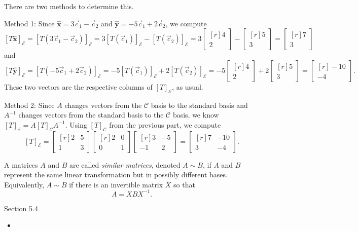 \documentclass{problemset}
\newcommand{\xhat}{{\hat {\mathbf x}}}
\newcommand{\yhat}{{\hat {\mathbf y}}}
\newcommand{\mat}[1]{\begin{bmatrix*}[r]#1\end{bmatrix*}}
\begin{document}
\begin{parts}[resume]
\begin{solution}
				There are two methods to determine this.

				Method 1: 
				Since $\xhat=3\vec c_1-\vec c_2$ and $\yhat=-5\vec c_1+2\vec c_2$,
				we compute
				\[
					[T\xhat]_{\mathcal E}
					=[T(3\vec c_1-\vec c_2)]_{\mathcal E}
					=3[T(\vec c_1)]_{\mathcal E}-[T(\vec c_2)]_{\mathcal E}
					=3\mat{4\\2}-\mat{5\\3}
					=\mat{7\\3}
				\]
				and
				\[
					[T\yhat]_{\mathcal E}
					=[T(-5\vec c_1+2\vec c_2)]_{\mathcal E}
					=-5[T(\vec c_1)]_{\mathcal E}+2[T(\vec c_2)]_{\mathcal E}
					=-5\mat{4\\2}+2\mat{5\\3}
					=\mat{-10\\-4}.
				\]
				These two vectors are the respective columns of $[T]_{\mathcal E}$,
				as usual.

				Method 2:
				Since $A$ changes vectors from the $\mathcal C$ basis to the standard
				basis and $A^{-1}$ changes vectors from the standard basis to the
				$\mathcal C$ basis, we know $[T]_{\mathcal E} = A[T]_{\mathcal C}A^{-1}$. 
				Using $[T]_{\mathcal C}$ from the previous part, we compute
				\[
					[T]_{\mathcal E}
					=\mat{2&5\\1&3}\mat{2&0\\0&1}\mat{3&-5\\-1&2}
					=\mat{7&-10\\3&-4}.
				\]


			\end{solution}
	\end{parts}
	\begin{definition}
		A matrices $A$ and $B$ are called \emph{similar matrices}, denoted $A\sim B$, if
		$A$ and $B$ represent the same linear transformation but in possibly different bases.
		Equivalently, $A\sim B$ if there is an invertible matrix $X$ so that
		\[
			A=XBX^{-1}.
		\]
	\end{definition}



	
\begin{lesson}
	\newpage

	Section 5.4

	\begin{itemize}
		\item 
	\end{itemize}


	\newpage
\end{lesson}
\newpage
\end{document}
